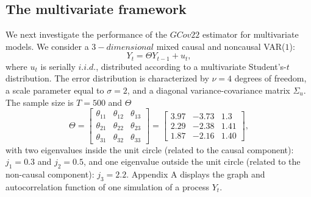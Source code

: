 \documentclass[<1p>]{elsarticle} %
\begin{document}
\subsection{The multivariate framework}
We next investigate the performance of the $GCov22$ estimator for multivariate models. We consider a $3-dimensional$ mixed causal and noncausal  VAR($1$):
\begin{equation}
    Y_t=\Theta Y_{t-1}+u_t,
\end{equation}
where $u_t$ is serially $i.i.d.$, distributed according to a multivariate Student's-$t$ distribution. The error distribution is characterized by $\nu=4$ degrees of freedom, a scale parameter equal to $\sigma=2$, and a diagonal variance-covariance matrix $\Sigma_u$. The sample size is $T=500$ and $\Theta$
\begin{equation}
    \Theta=\begin{bmatrix}
        \theta_{11} & \theta_{12} & \theta_{13}\\
        \theta_{21} & \theta_{22} & \theta_{23}\\
        \theta_{31} &\theta_{32} & \theta_{33}
    \end{bmatrix} =
    \begin{bmatrix}
        3.97 & -3.73 & 1.3\\
        2.29 & -2.38 & 1.41\\
        1.87 &-2.16 & 1.40
    \end{bmatrix} , 
\end{equation}
with two eigenvalues inside the unit circle (related to the causal component): $j_1 = 0.3$ and $j_2 = 0.5$, and one eigenvalue outside the unit circle (related to the non-causal component): $j_3 = 2.2$. Appendix A displays the graph and autocorrelation function of one simulation of a process $Y_t$.\\
\end{document}
